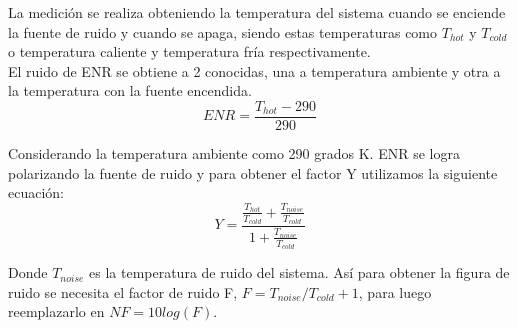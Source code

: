 La medición se realiza obteniendo la temperatura del sistema cuando se enciende la fuente de ruido y cuando se apaga, siendo estas temperaturas como $T_{hot}$ y $T_{cold}$ o temperatura caliente y temperatura fría respectivamente.\\

El ruido de ENR se obtiene a 2  conocidas, una a temperatura ambiente y otra a la temperatura con la fuente encendida.\\

\begin{equation}
    ENR = \frac{T_{hot} - 290}{290}
\end{equation}

Considerando la temperatura ambiente como 290 grados K. ENR se logra polarizando la fuente de ruido y para obtener el factor Y utilizamos la siguiente ecuación:\\

\begin{equation}
    Y = \frac{\frac{T_{hot}}{T_{cold}} + \frac{T_{noise}}{T_{cold}}}{1 + \frac{T_{noise}}{T_{cold}}}
\end{equation}

Donde $T_{noise}$ es la temperatura de ruido del sistema. Así para obtener la figura de ruido se necesita el factor de ruido F, $F=T_{noise}/T_{cold} +1 $, para luego reemplazarlo en $NF = 10log(F)$\cite{analogNoiseFigure}.\\










